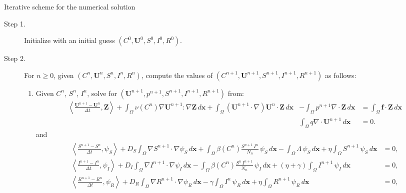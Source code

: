 \documentclass[10pt,number,preprint,times]{elsarticle}
\numberwithin{equation}{section} %
\begin{document}
\begin{algorithm}[H]
	\caption{Iterative scheme for the numerical solution}
	\footnotesize
	\begin{description}
		\item[Step 1. ] Initialize with an initial guess $(C^0, \boldsymbol{U}^0, S^0 , I^0 , R^0)$.
		
		\item[Step 2. ] For $n \geq 0$, given $\left(C^n, \boldsymbol{U}^n, S^n , I^n , R^n\right)$, compute the values of $\left(C^{n+1}, \boldsymbol{U}^{n+1}, S^{n+1} , I^{n+1} , R^{n+1}\right)$ as follows:
		\begin{enumerate}
			\item Given $C^n$, $S^n$, $I^n$, solve for $(\boldsymbol{U}^{n+1},  p^{n+1}, S^{n+1}, I^{n+1}, R^{n+1})$ from:
			\begin{eqnarray*}
				\left\langle \frac{\boldsymbol{U}^{n+1}-\boldsymbol{U}^{n}}{\Delta t}, \boldsymbol{Z} \right\rangle 
				+ \int_{\Omega}\nu(C^n) \nabla\boldsymbol{U}^{n+1}: \nabla \boldsymbol{Z} \, d\mathbf{x}
				+ \int_{\Omega}(\boldsymbol{U}^{n+1}\cdot \nabla) \boldsymbol{U}^{n}\cdot \boldsymbol{Z} \, d\mathbf{x} 
				&- \displaystyle\int_{\Omega} p^{n+1} \nabla \cdot \boldsymbol{Z} \, d\mathbf{x} 
				&= \int_{\Omega}\boldsymbol{f}\cdot \boldsymbol{Z}\, d\mathbf{x} \\
				&     \displaystyle  \int_{\Omega} q \nabla \cdot \boldsymbol{U}^{n+1} \, d\mathbf{x} 
				&= 0.
			\end{eqnarray*}
			and			
			\begin{eqnarray*}
				\begin{split}  	  		
					\left\langle \frac{S^{n+1}-S^{n}}{\Delta t}, \psi_S \right\rangle+ D_S\int_{\Omega}\nabla S^{n+1} \cdot\nabla \psi_S\, d\mathbf{x}+\int_{\Omega}\beta(C^n) \frac{S^{n+1}\,I^n}{N_n} \, \psi_S\, d\mathbf{x}%
					-\int_{\Omega} \Lambda \,\psi_S \, d\mathbf{x} + \eta \int_{\Omega} S^{n+1} \,\psi_S \, d\mathbf{x}
					&=0,
					\\ 	  		
					\left\langle \frac{I^{n+1}-I^{n}}{\Delta t}, \psi_I \right\rangle+ D_I\int_{\Omega}\nabla I^{n+1} \cdot\nabla \psi_I\, d\mathbf{x}-\int_{\Omega}\beta(C^n) \frac{S^n\,I^{n+1}}{N_n} \, \psi_I\, d\mathbf{x} + (\eta+\gamma) \int_{\Omega} I^{n+1} \,\psi_I \, d\mathbf{x}
					&=0,
					\\ 	  		
					\left\langle \frac{R^{n+1}-R^{n}}{\Delta t}, \psi_R \right\rangle+ D_R\int_{\Omega}\nabla R^{n+1} \cdot\nabla \psi_R\, d\mathbf{x}-\gamma\int_{\Omega} I^n \,\psi_R \, d\mathbf{x}+ \eta\int_{\Omega} R^{n+1} \,\psi_R \, d\mathbf{x}
					&=0,
				\end{split} 
			\end{eqnarray*} 
			

\end{enumerate}
\end{description}
\end{algorithm}
\end{document}

